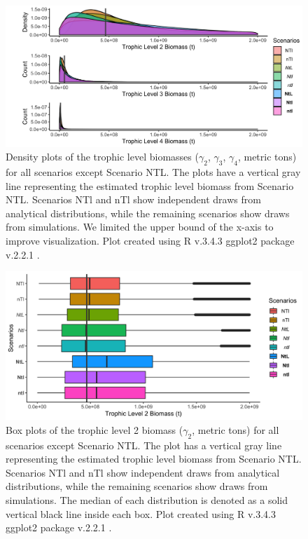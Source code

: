 \documentclass[oneside,12pt,final]{sty/ucthesis-CA2012}
\let\cite\citep                             %
\begin{document}
\begin{mainmatter}
\begin{figure}[H]
     \centering
       \includegraphics[width=1\textwidth]{fig/biomass_dens.png}
    \caption{Density plots of the trophic level biomasses ($\gamma_2$, $\gamma_3$, $\gamma_4$, metric tons) for all scenarios except Scenario NTL. The plots have a vertical gray line representing the estimated trophic level biomass from Scenario NTL. Scenarios NTl and nTl show independent draws from analytical distributions, while the remaining scenarios show draws from simulations. We limited the upper bound of the x-axis to improve visualization. Plot created using R v.3.4.3 \cite{Rcite} ggplot2 package v.2.2.1 \cite{ggplot}. }
    \label{betaestimated}
\end{figure}

\begin{figure}[H]
     \centering
       \includegraphics[width=1\textwidth]{fig/biomass2_box.png}
    \caption{Box plots of the trophic level 2 biomass ($\gamma_2$, metric tons) for all scenarios except Scenario NTL. The plot has a vertical gray line representing the estimated trophic level biomass from Scenario NTL. Scenarios NTl and nTl show independent draws from analytical distributions, while the remaining scenarios show draws from simulations. The median of each distribution is denoted as a solid vertical black line inside each box. Plot created using R v.3.4.3 \cite{Rcite} ggplot2 package v.2.2.1 \cite{ggplot}. }
    \label{beta2estimated}
\end{figure}


\end{mainmatter}
\end{document}
